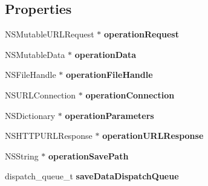 \subsection*{Properties}
\begin{DoxyCompactItemize}
\item 
\hypertarget{category_k_z_h_t_t_p_request_07_08_a1fc9dc6656db588c3c0b23700b08133e}{N\-S\-Mutable\-U\-R\-L\-Request $\ast$ {\bfseries operation\-Request}}\label{category_k_z_h_t_t_p_request_07_08_a1fc9dc6656db588c3c0b23700b08133e}

\item 
\hypertarget{category_k_z_h_t_t_p_request_07_08_ae9d41d90877e6bc6c7e4d961b0966974}{N\-S\-Mutable\-Data $\ast$ {\bfseries operation\-Data}}\label{category_k_z_h_t_t_p_request_07_08_ae9d41d90877e6bc6c7e4d961b0966974}

\item 
\hypertarget{category_k_z_h_t_t_p_request_07_08_af6bd63b36d9bee9f0bf49b2422f5ea2f}{N\-S\-File\-Handle $\ast$ {\bfseries operation\-File\-Handle}}\label{category_k_z_h_t_t_p_request_07_08_af6bd63b36d9bee9f0bf49b2422f5ea2f}

\item 
\hypertarget{category_k_z_h_t_t_p_request_07_08_a6fe8bc8d52d53bdd13e24bd916350c2e}{N\-S\-U\-R\-L\-Connection $\ast$ {\bfseries operation\-Connection}}\label{category_k_z_h_t_t_p_request_07_08_a6fe8bc8d52d53bdd13e24bd916350c2e}

\item 
\hypertarget{category_k_z_h_t_t_p_request_07_08_a182c303b8c453803527b023afb6e3d63}{N\-S\-Dictionary $\ast$ {\bfseries operation\-Parameters}}\label{category_k_z_h_t_t_p_request_07_08_a182c303b8c453803527b023afb6e3d63}

\item 
\hypertarget{category_k_z_h_t_t_p_request_07_08_a25b56b782d8840177fa9e45ee3b52dc4}{N\-S\-H\-T\-T\-P\-U\-R\-L\-Response $\ast$ {\bfseries operation\-U\-R\-L\-Response}}\label{category_k_z_h_t_t_p_request_07_08_a25b56b782d8840177fa9e45ee3b52dc4}

\item 
\hypertarget{category_k_z_h_t_t_p_request_07_08_aab18c4cb521efae15cd33d3fa7dc6d2e}{N\-S\-String $\ast$ {\bfseries operation\-Save\-Path}}\label{category_k_z_h_t_t_p_request_07_08_aab18c4cb521efae15cd33d3fa7dc6d2e}

\item 
\hypertarget{category_k_z_h_t_t_p_request_07_08_a19505941614359ab03f26152ed7cd97b}{dispatch\-\_\-queue\-\_\-t {\bfseries save\-Data\-Dispatch\-Queue}}\label{category_k_z_h_t_t_p_request_07_08_a19505941614359ab03f26152ed7cd97b}


\end{DoxyCompactItemize}
